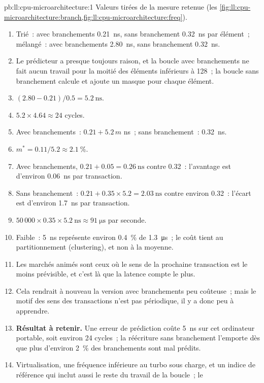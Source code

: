 \begin{solution}{pb:ll:cpu-microarchitecture:1}
Valeurs tirées de la mesure retenue (les \cref{fig:ll:cpu-microarchitecture:branch,fig:ll:cpu-microarchitecture:freq}).
\begin{enumerate}
\item Trié~: avec branchements \qty{0.21}{\nano\second}, sans branchement \qty{0.32}{\nano\second} par élément~; mélangé~: avec branchements
\qty{2.80}{\nano\second}, sans branchement \qty{0.32}{\nano\second}.
\item Le prédicteur a presque toujours raison, et la boucle avec branchements ne fait aucun travail pour la moitié des éléments inférieurs à 128~;
la boucle sans branchement calcule et ajoute un masque pour chaque élément.
\item $(2.80 - 0.21)/0.5 = \qty{5.2}{\nano\second}$.
\item $5.2 \times 4.64 \approx 24$ cycles.
\item Avec branchements~: $0.21 + 5.2\,m$ ns~; sans branchement~: \qty{0.32}{\nano\second}.
\item $m^\ast = 0.11/5.2 \approx 2.1~\%$.
\item Avec branchements, $0.21 + 0.05 = \qty{0.26}{\nano\second}$ contre 0.32~: l'avantage est d'environ \qty{0.06}{\nano\second} par transaction.
\item Sans branchement~: $0.21 + 0.35 \times 5.2 = \qty{2.03}{\nano\second}$ contre environ 0.32~: l'écart est d'environ
\qty{1.7}{\nano\second} par transaction.
\item $50\,000 \times 0.35 \times \qty{5.2}{\nano\second} \approx \qty{91}{\micro\second}$ par seconde.
\item Faible~: \qty{5}{\nano\second} représente environ 0.4~\% de \qty{1.3}{\micro\second}~; le coût tient au partitionnement (clustering),
et non à la moyenne.
\item Les marchés animés sont ceux où le sens de la prochaine transaction est le moins prévisible, et c'est là que la latence
compte le plus.
\item Cela rendrait à nouveau la version avec branchements peu coûteuse~; mais le motif des sens des transactions n'est pas périodique, il y a donc peu
à apprendre.
\item \textbf{Résultat à retenir.} Une erreur de prédiction coûte \qty{5}{\nano\second} sur cet ordinateur portable, soit environ 24 cycles~; la
réécriture sans branchement l'emporte dès que plus d'environ 2~\% des branchements sont mal prédits.
\item Virtualisation, une fréquence inférieure au turbo sous charge, et un indice de référence qui inclut aussi le reste du travail de la boucle~; le

\end{enumerate}
\end{solution}
